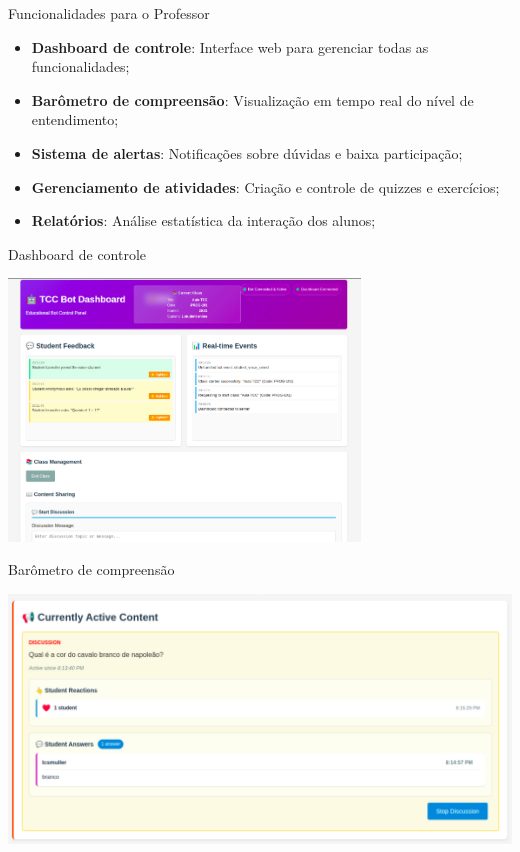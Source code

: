 \documentclass[aspectratio=169]{beamer}
\begin{document}
{\begin{frame}{Funcionalidades para o Professor}
  \begin{itemize}
  \item \textbf{Dashboard de controle}: Interface web para gerenciar todas as funcionalidades;
  \item \textbf{Barômetro de compreensão}: Visualização em tempo real do nível de entendimento;
  \item \textbf{Sistema de alertas}: Notificações sobre dúvidas e baixa participação;
  \item \textbf{Gerenciamento de atividades}: Criação e controle de quizzes e exercícios;
  \item \textbf{Relatórios}: Análise estatística da interação dos alunos;
  \end{itemize}
\end{frame}

\begin{frame}{Dashboard de controle}
  \begin{center}
    \includegraphics[width=0.7\textwidth]{func-professores/1.png}
  \end{center}
\end{frame}

\begin{frame}{Barômetro de compreensão}
  \begin{center}
    \includegraphics[width=1.0\textwidth]{func-professores/2.png}
  \end{center}
\end{frame}

}
\end{document}
